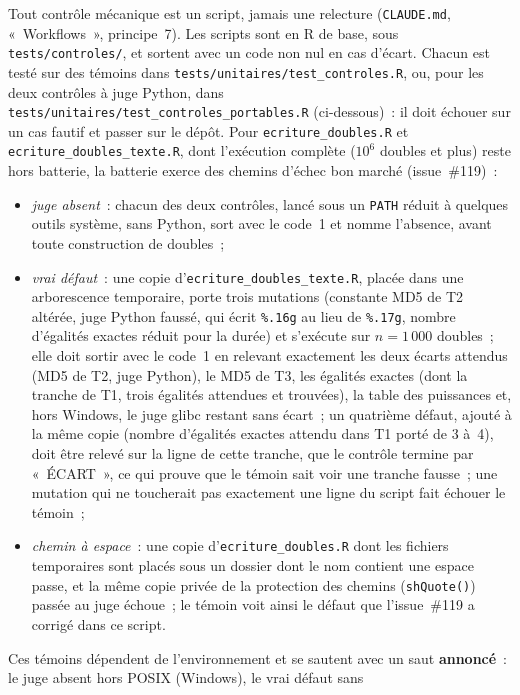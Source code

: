 \documentclass[a4paper,11pt]{article}
\newcommand{\code}[1]{\texttt{\small #1}}
\begin{document}
Tout contrôle mécanique est un script, jamais une relecture (\code{CLAUDE.md},
«~Workflows~», principe~7). Les scripts sont en R de base, sous
\code{tests/controles/}, et sortent avec un code non nul en cas d'écart. Chacun
est testé sur des témoins dans \code{tests/unitaires/test\_controles.R}, ou,
pour les deux contrôles à juge Python, dans
\code{tests/unitaires/test\_controles\_portables.R} (ci-dessous)~: il
doit échouer sur un cas fautif et passer sur le dépôt. Pour
\code{ecriture\_doubles.R} et \code{ecriture\_doubles\_texte.R}, dont
l'exécution complète ($10^{6}$ doubles et plus) reste hors batterie, la
batterie exerce des chemins d'échec bon marché (issue~\#119)~:
\begin{itemize}[leftmargin=*, itemsep=1pt]
  \item \emph{juge absent}~: chacun des deux contrôles, lancé sous un
    \code{PATH} réduit à quelques outils système, sans Python, sort avec le
    code~1 et nomme l'absence, avant toute construction de doubles~;
  \item \emph{vrai défaut}~: une copie d'\code{ecriture\_doubles\_texte.R},
    placée dans une arborescence temporaire, porte trois mutations
    (constante MD5 de T2 altérée, juge Python faussé, qui écrit
    \code{\%.16g} au lieu de \code{\%.17g}, nombre d'égalités exactes
    réduit pour la durée) et s'exécute sur $n = 1\,000$ doubles~; elle doit
    sortir avec le code~1 en relevant exactement les deux écarts attendus
    (MD5 de T2, juge Python), le MD5 de T3, les égalités exactes (dont la
    tranche de T1, trois égalités attendues et trouvées), la table
    des puissances et, hors Windows, le juge glibc restant sans écart~; un
    quatrième défaut, ajouté à la même copie (nombre d'égalités exactes
    attendu dans T1 porté de 3 à~4), doit être relevé sur la ligne de cette
    tranche, que le contrôle termine par «~ÉCART~», ce qui prouve que le
    témoin sait voir une tranche fausse~; une mutation qui ne
    toucherait pas exactement une ligne du script fait échouer le témoin~;
  \item \emph{chemin à espace}~: une copie d'\code{ecriture\_doubles.R}
    dont les fichiers temporaires sont placés sous un dossier dont le nom
    contient une espace passe, et la même copie privée de la protection
    des chemins (\code{shQuote()}) passée au juge échoue~; le témoin voit
    ainsi le défaut que l'issue~\#119 a corrigé dans ce script.
\end{itemize}
Ces témoins dépendent de l'environnement et se sautent avec un saut
\textbf{annoncé}~: le juge absent hors POSIX (Windows), le vrai défaut sans
\end{document}
